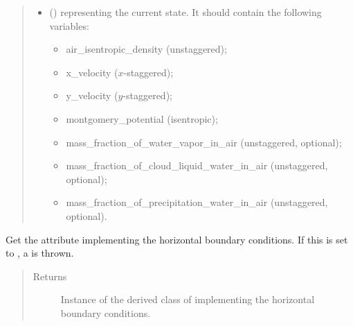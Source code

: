 \documentclass[letterpaper,10pt,english]{sphinxmanual}
\begin{document}
\begin{fulllineitems}
\begin{fulllineitems}
\begin{quote}
\begin{description}
\begin{itemize}
\item {} 
 () \textendash{} 
{\hyperref[\detokenize{api:tasmania.storages.state_isentropic.StateIsentropic}]{}} representing the current state.
It should contain the following variables:
\begin{itemize}
\item {} 
air\_isentropic\_density (unstaggered);

\item {} 
x\_velocity (\(x\)-staggered);

\item {} 
y\_velocity (\(y\)-staggered);

\item {} 
montgomery\_potential (isentropic);

\item {} 
mass\_fraction\_of\_water\_vapor\_in\_air (unstaggered, optional);

\item {} 
mass\_fraction\_of\_cloud\_liquid\_water\_in\_air (unstaggered, optional);

\item {} 
mass\_fraction\_of\_precipitation\_water\_in\_air (unstaggered, optional).

\end{itemize}


\end{itemize}

\end{description}\end{quote}

\end{fulllineitems}


\begin{fulllineitems}
\label{\detokenize{api:tasmania.dycore.prognostic_isentropic_nonconservative.PrognosticIsentropicNonconservative.boundary}}
Get the attribute implementing the horizontal boundary conditions.
If this is set to , a  is thrown.
\begin{quote}\begin{description}
\item[{Returns}] \leavevmode
Instance of the derived class of {\hyperref[\detokenize{api:tasmania.dycore.horizontal_boundary.HorizontalBoundary}]{}} implementing
the horizontal boundary conditions.


\end{description}
\end{quote}
\end{fulllineitems}
\end{fulllineitems}
\end{document}
